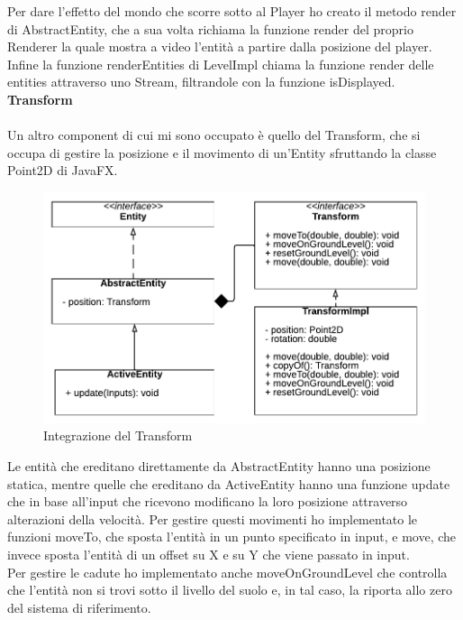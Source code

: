 \documentclass{article}
\begin{document}
Per dare l'effetto del mondo che scorre sotto al Player ho creato il metodo render di AbstractEntity, che a sua volta richiama la funzione render del proprio Renderer la quale mostra a video l'entità a partire dalla posizione del player.\\

Infine la funzione renderEntities di LevelImpl chiama la funzione render delle entities attraverso uno Stream, filtrandole con la funzione isDisplayed.\\

\textbf{Transform}\\
\\
Un altro component di cui mi sono occupato è quello del Transform, che si occupa di gestire la posizione e il movimento di un'Entity sfruttando la classe Point2D di JavaFX.

\begin{figure}[ht]
\includegraphics[width=1\textwidth]{images/Transform.png}
\caption{Integrazione del Transform}
\label{fig:transform}
\end{figure}

Le entità che ereditano direttamente da AbstractEntity hanno una posizione statica, mentre quelle che ereditano da ActiveEntity hanno una funzione update che in base all'input che ricevono modificano la loro posizione attraverso alterazioni della velocità. Per gestire questi movimenti ho implementato le funzioni moveTo, che sposta l'entità in un punto specificato in input, e move, che invece sposta l'entità di un offset su X e su Y che viene passato in input.\\
Per gestire le cadute ho implementato anche moveOnGroundLevel che controlla che l'entità non si trovi sotto il livello del suolo e, in tal caso, la riporta allo zero del sistema di riferimento.\\
\end{document}

